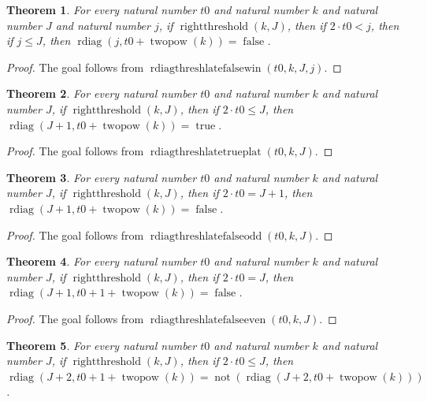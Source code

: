 \documentclass[11pt]{article}
\newtheorem{theorem}{Theorem}[section]
\theoremstyle{definition}
\begin{document}
\begin{theorem}
\label{ll:paper:rdiag-threshold-late-false-window}
For every natural number \(t0\) and natural number \(k\) and natural number \(J\) and natural number \(j\), if \(\operatorname{rightthreshold}(k, J)\), then if \(2 \cdot t0 < j\), then if \(j \le J\), then \(\operatorname{rdiag}(j, t0 + \operatorname{twopow}(k)) = \operatorname{false}\).
\end{theorem}
\begin{proof}
The goal follows from \(\operatorname{rdiagthreshlatefalsewin}(t0, k, J, j)\).
\end{proof}
\begin{theorem}
\label{ll:paper:rdiag-threshold-late-true-plateau}
For every natural number \(t0\) and natural number \(k\) and natural number \(J\), if \(\operatorname{rightthreshold}(k, J)\), then if \(2 \cdot t0 \le J\), then \(\operatorname{rdiag}(J + 1, t0 + \operatorname{twopow}(k)) = \operatorname{true}\).
\end{theorem}
\begin{proof}
The goal follows from \(\operatorname{rdiagthreshlatetrueplat}(t0, k, J)\).
\end{proof}
\begin{theorem}
\label{ll:paper:rdiag-threshold-late-false-odd-hit}
For every natural number \(t0\) and natural number \(k\) and natural number \(J\), if \(\operatorname{rightthreshold}(k, J)\), then if \(2 \cdot t0 = J + 1\), then \(\operatorname{rdiag}(J + 1, t0 + \operatorname{twopow}(k)) = \operatorname{false}\).
\end{theorem}
\begin{proof}
The goal follows from \(\operatorname{rdiagthreshlatefalseodd}(t0, k, J)\).
\end{proof}
\begin{theorem}
\label{ll:paper:rdiag-threshold-late-false-even-hit}
For every natural number \(t0\) and natural number \(k\) and natural number \(J\), if \(\operatorname{rightthreshold}(k, J)\), then if \(2 \cdot t0 = J\), then \(\operatorname{rdiag}(J + 1, t0 + 1 + \operatorname{twopow}(k)) = \operatorname{false}\).
\end{theorem}
\begin{proof}
The goal follows from \(\operatorname{rdiagthreshlatefalseeven}(t0, k, J)\).
\end{proof}
\begin{theorem}
\label{ll:paper:rdiag-threshold-plus-two-step-neg}
For every natural number \(t0\) and natural number \(k\) and natural number \(J\), if \(\operatorname{rightthreshold}(k, J)\), then if \(2 \cdot t0 \le J\), then \(\operatorname{rdiag}(J + 2, t0 + 1 + \operatorname{twopow}(k)) = \operatorname{not}(\operatorname{rdiag}(J + 2, t0 + \operatorname{twopow}(k)))\).
\end{theorem}
\end{document}
